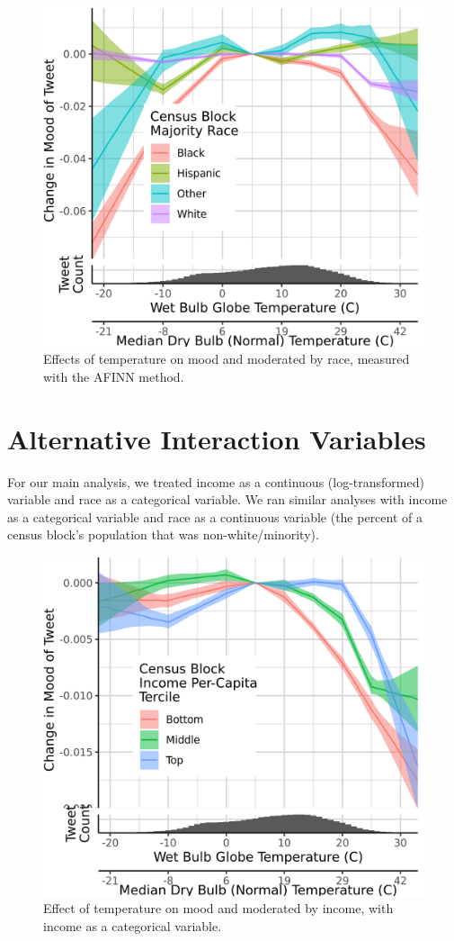 \documentclass{article}
\begin{document}
\begin{figure}[H]
  \centering
  \includegraphics[width=0.6\linewidth]{../res/afinn-wbgt-race_q.png}
  \caption{Effects of temperature on mood and moderated by race, measured with the AFINN method.}
\end{figure}


\section{Alternative Interaction Variables}
For our main analysis, we treated income as a continuous (log-transformed) variable and race as a categorical variable.  We ran similar analyses with income as a categorical variable and race as a continuous variable (the percent of a census block's population that was non-white/minority).

\begin{figure}[H]
  \centering
  \includegraphics[width=0.6\linewidth]{../res/wbgt-income_q.png}
  \caption{Effect of temperature on mood and moderated by income, with income as a categorical variable.}
\end{figure}
\end{document}
